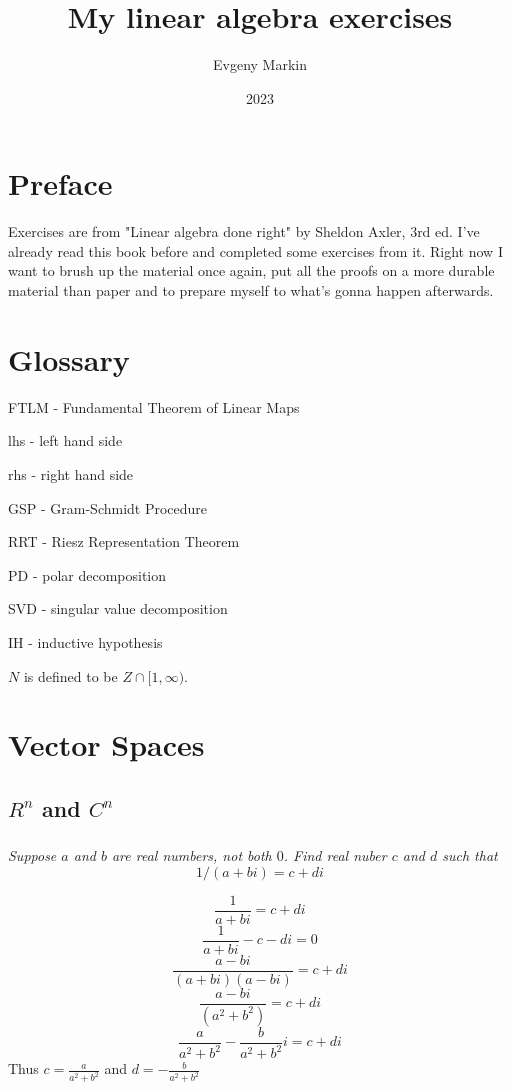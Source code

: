 \documentclass[11pt,oneside,titlepage]{book}
\title{My linear algebra exercises}
\author{Evgeny Markin}
\date{2023}
\begin{document}
\maketitle
\tableofcontents

\chapter*{Preface}

Exercises are from "Linear algebra done right" by Sheldon Axler, 3rd ed.
I've already read this book before and completed some exercises from it.
Right now I want to brush up the material once again, put all the
proofs on a more durable material than paper and to prepare myself to
what's gonna happen afterwards.

\chapter*{Glossary}

FTLM - Fundamental Theorem of Linear Maps

lhs - left hand side

rhs - right hand side

GSP - Gram-Schmidt Procedure

RRT - Riesz Representation Theorem

PD - polar decomposition

SVD - singular value decomposition

IH - inductive hypothesis

$N$ is defined to be $Z \cap [1, \infty)$.

\chapter{Vector Spaces}
\section{$R^n$ and $C^n$}

\subsection{}
\textit{Suppose $a$ and $b$ are real numbers, not both $0$. Find real nuber
  $c$ and $d$ such that }
$$1/(a + bi) = c + di$$

$$\frac{1}{a + bi} = c + di$$
$$\frac{1}{a + bi} - c - di = 0$$
$$\frac{a - bi}{(a + bi)(a - bi)} = c + di$$
$$\frac{a - bi}{(a^2 + b^2)} = c + di$$
$$\frac{a}{a^2 + b^2} - \frac{b}{a^2 + b^2}i = c + di$$
Thus $c = \frac{a}{a^2 + b^2}$ and $d = -\frac{b}{a^2 + b^2}$
\end{document}
